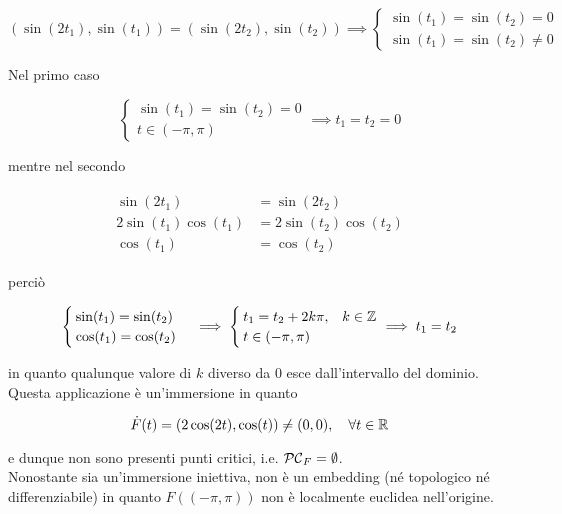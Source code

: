\begin{equation}
	(\sin(2t_{1}), \sin(t_{1})) = (\sin(2t_{2}), \sin(t_{2})) %
	\implies %
	\begin{cases}
		\sin(t_{1}) = \sin(t_{2}) = 0 \\
		\sin(t_{1}) = \sin(t_{2}) \neq 0
	\end{cases}
\end{equation}

Nel primo caso

\begin{equation}
	\begin{cases}
		\sin(t_{1}) = \sin(t_{2}) = 0 \\
		t \in (-\pi,\pi)
	\end{cases} %
	\implies %
	t_{1} = t_{2} = 0
\end{equation}

mentre nel secondo

\begin{align}
	\begin{split}
		\sin(2t_{1}) &= \sin(2t_{2}) \\
		2 \sin(t_{1}) \cos(t_{1}) &= 2 \sin(t_{2}) \cos(t_{2}) \\
		\cos(t_{1}) &= \cos(t_{2})
	\end{split}		
\end{align}

perciò

\begin{equation}
	\begin{cases}
		\sin(t_{1}) = \sin(t_{2}) \\
		\cos(t_{1}) = \cos(t_{2})
	\end{cases} %
	\implies %
	\begin{cases}
		t_{1} = t_{2} + 2 k \pi, & k \in \Z \\
		t \in (-\pi,\pi)
	\end{cases} %
	\implies %
	t_{1} = t_{2}
\end{equation}

in quanto qualunque valore di $ k $ diverso da 0 esce dall'intervallo del dominio. \\
Questa applicazione è un'immersione in quanto

\begin{equation}
	\dot{F}(t) = (2 \cos(2t), \cos(t)) \neq (0,0) \qcomma \forall t \in \R
\end{equation}

e dunque non sono presenti punti critici, i.e. $ \mathcal{PC}_{F} = \emptyset $. \\
Nonostante sia un'immersione iniettiva, non è un embedding (né topologico né differenziabile) in quanto $ F((-\pi,\pi)) $ non è localmente euclidea nell'origine.

